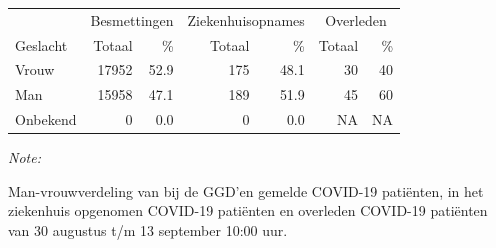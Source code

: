 \documentclass[
  english,
  man,floatsintext]{apa6}
\begin{document}
\begin{table}
\centering\begingroup\fontsize{11}{13}\selectfont

\begin{threeparttable}
\begin{tabular}{lrrrrrr}
\toprule
\multicolumn{1}{c}{ } & \multicolumn{2}{c}{Besmettingen} & \multicolumn{2}{c}{Ziekenhuisopnames} & \multicolumn{2}{c}{Overleden} \\
\cmidrule(l{3pt}r{3pt}){2-3} \cmidrule(l{3pt}r{3pt}){4-5} \cmidrule(l{3pt}r{3pt}){6-7}
Geslacht & Totaal & \% & Totaal & \% & Totaal & \%\\
\midrule
Vrouw & 17952 & 52.9 & 175 & 48.1 & 30 & 40\\
Man & 15958 & 47.1 & 189 & 51.9 & 45 & 60\\
Onbekend & 0 & 0.0 & 0 & 0.0 & NA & NA\\
\bottomrule
\end{tabular}
\begin{tablenotes}
\item \textit{Note: } 
\item Man-vrouwverdeling van bij de GGD’en gemelde COVID-19 patiënten, in het ziekenhuis opgenomen COVID-19 patiënten en overleden COVID-19 patiënten van 30 augustus t/m 13 september 10:00 uur.
\end{tablenotes}
\end{threeparttable}
\endgroup{}
\end{table}
\newpage
\end{document}
